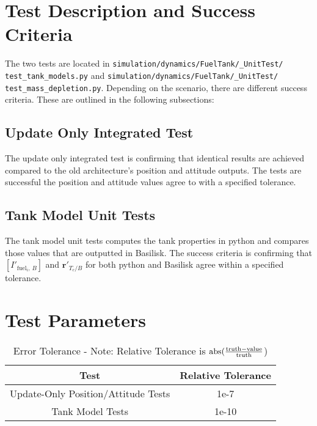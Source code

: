 

\section{Test Description and Success Criteria}
The two tests are located in \texttt{simulation/dynamics/FuelTank/\_UnitTest/\newline
test\_tank\_models.py} and \texttt{simulation/dynamics/FuelTank/\_UnitTest/\newline
test\_mass\_depletion.py}. Depending on the scenario, there are different success criteria. These are outlined in the following subsections:
\subsection{Update Only Integrated Test}

The update only integrated test is confirming that identical results are achieved compared to the old architecture's position and attitude outputs. The tests are successful the position and attitude values agree to with a specified tolerance.

\subsection{Tank Model Unit Tests}

The tank model unit tests computes the tank properties in python and compares those values that are outputted in Basilisk. The success criteria is confirming that $\left[I'_{\text{fuel}_i,\,B}\right]$ and $\bm r'_{T_c/B}$ for both python and Basilisk agree within a specified tolerance.

\section{Test Parameters}

\begin{table}[htbp]
	\caption{Error Tolerance - Note: Relative Tolerance is $\textnormal{abs}(\frac{\textnormal{truth} - \textnormal{value}}{\textnormal{truth}}$)}
	\label{tab:errortol}
	\centering \fontsize{10}{10}\selectfont
	\begin{tabular}{| c | c |} %
		\hline
		Test   & Relative Tolerance \\
		\hline
		Update-Only Position/Attitude Tests  & 1e-7 \\
		\hline
		Tank Model Tests & 1e-10 \\
		\hline	
	\end{tabular}
\end{table}

